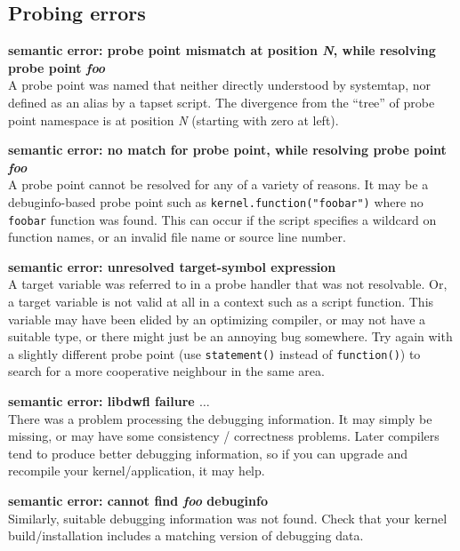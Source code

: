 \documentclass{article}
\begin{document}
\subsection{Probing errors }

\begin{description}
\item{\bf semantic error: probe point mismatch at position {\em N},
while resolving probe point {\em foo}} \\ A probe point was named that
neither directly understood by systemtap, nor defined as an alias by a
tapset script.  The divergence from the ``tree'' of probe point
namespace is at position {\em N} (starting with zero at left).

\item{\bf semantic error: no match for probe point, while resolving
probe point {\em foo}} \\ A probe point cannot be resolved for any of
a variety of reasons.  It may be a debuginfo-based probe point such as
\verb+kernel.function("foobar")+ where no \verb+foobar+ function was
found.  This can occur if the script specifies a wildcard on function
names, or an invalid file name or source line number.

\item{\bf semantic error: unresolved target-symbol expression} \\ A
target variable was referred to in a probe handler that was not
resolvable.  Or, a target variable is not valid at all in a context
such as a script function.  This variable may have been elided by an
optimizing compiler, or may not have a suitable type, or there might
just be an annoying bug somewhere.  Try again with a slightly
different probe point (use \verb+statement()+ instead of
\verb+function()+) to search for a more cooperative neighbour in the
same area.

\item{\bf semantic error: libdwfl failure $\ldots$} \\ There was a
problem processing the debugging information.  It may simply be
missing, or may have some consistency / correctness problems.  Later
compilers tend to produce better debugging information, so if you can
upgrade and recompile your kernel/application, it may help.

\item{\bf semantic error: cannot find {\em foo} debuginfo} \\ Similarly,
suitable debugging information was not found.  Check that your kernel
build/installation includes a matching version of debugging data.
\end{description}
\end{document}
